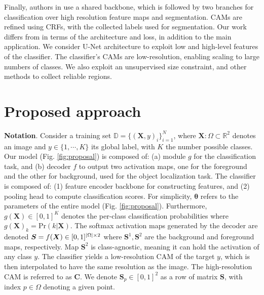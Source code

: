 \documentclass[twocolumn]{article}
\newcommand{\reals}{\mathbb{R}}
\newcommand{\abs}[1]{\ensuremath \left| #1 \right|}
\theoremstyle{definition}
\begin{document}
Finally, authors in \cite{ZhangXWSH20RELI} use a shared backbone, which is followed by two branches for classification over high resolution feature maps and segmentation. CAMs are refined using CRFs, with the collected labels used for segmentation. Our work differs from \cite{ZhangXWSH20RELI} in terms of the architecture and loss, in addition to the main application. We consider U-Net architecture to exploit low and high-level features of the classifier. The classifier's CAMs are low-resolution, enabling scaling to large numbers of classes. We also exploit an unsupervised size constraint, and other methods to collect reliable regions.



\section{Proposed approach}
\label{sec:proposal}

\noindent \textbf{Notation}. Consider a training set ${\mathbb{D} = \{(\bm{X}, y)_i\}_{i=1}^N}$, where ${\bm{X}: \Omega \subset \reals^2}$ denotes an image and ${y \in \{1, \cdots, K\}}$ its global label, with $K$ the number possible classes. Our model (Fig. \ref{fig:proposal}) is composed of: (a) module ${g}$ for the classification task, and (b) decoder ${f}$ to output two activation maps, one for the foreground and the other for background, used for the object localization task. The classifier is composed of: (1) feature encoder backbone for constructing features, and (2) pooling head to compute classification scores. For simplicity, ${\bm{\theta}}$ refers to the parameters of the entire model (Fig. \ref{fig:proposal}).  Furthermore, ${g(\bm{X}) \in [0, 1]^K}$ denotes the per-class classification probabilities where ${g(\bm{X})_k = \mbox{Pr}(k | \bm{X})}$.
The softmax activation maps generated by the decoder are denoted ${\bm{S} = f(\bm{X}) \in [0, 1]^{\abs{\Omega} \times 2}}$ where ${\bm{S}^1, \bm{S}^2}$ are the background and foreground maps, respectively. Map ${\bm{S}^2}$ is class-agnostic, meaning it can hold the activation of any class $y$.
The classifier yields a low-resolution CAM of the target ${y}$, which is then interpolated to have the same resolution as the image. The high-resolution CAM is referred to as ${\bm{C}}$. We denote ${\bm{S}_p \in [0, 1]^2}$ as a row of matrix ${\bm{S}}$, with index ${p \in \Omega}$ denoting a given point.
\end{document}
